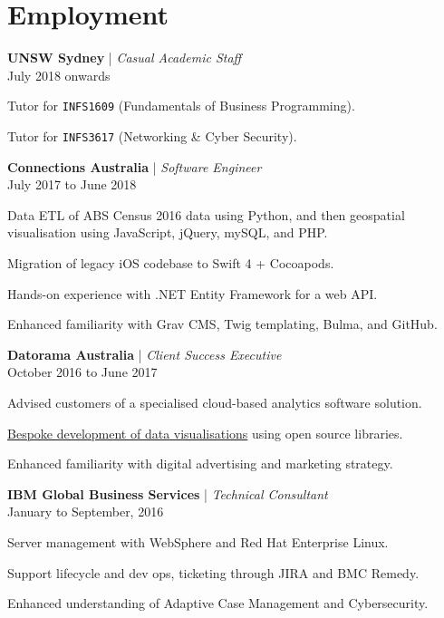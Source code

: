 \section*{Employment}

\noindent \textbf{UNSW Sydney} | \textit{Casual Academic Staff}
\\ July 2018 onwards
\begin{myitemize}
	\item Tutor for \texttt{INFS1609} (Fundamentals of Business Programming).
	\item Tutor for \texttt{INFS3617} (Networking \& Cyber Security).
\end{myitemize}

\vspace{20pt}

\noindent \textbf{Connections Australia} | \textit{Software Engineer}
\\ July 2017 to June 2018
\begin{myitemize}
	\item Data ETL of ABS Census 2016 data using Python, and then geospatial visualisation using JavaScript, jQuery, mySQL, and PHP.
	\item Migration of legacy iOS codebase to Swift 4 + Cocoapods.
	\item Hands-on experience with .NET Entity Framework for a web API.
	\item Enhanced familiarity with Grav CMS, Twig templating, Bulma, and GitHub.
\end{myitemize}

\vspace{20pt}

\noindent \textbf{Datorama Australia} | \textit{Client Success Executive}
\\ October 2016 to June 2017
\begin{myitemize}
	\item Advised customers of a specialised cloud-based analytics software solution.
	\item \href{https://datorama.com/blog/2017/06/28/datorama-tips-tricks-custom-visualizations-d3-js/}{Bespoke development of data visualisations} using open source libraries.
	\item Enhanced familiarity with digital advertising and marketing strategy.
\end{myitemize}

\vspace{20pt}

\noindent \textbf{IBM Global Business Services} | \textit{Technical Consultant}
\\ January to September, 2016
\begin{myitemize}
	\item Server management with WebSphere and Red Hat Enterprise Linux.
	\item Support lifecycle and dev ops, ticketing through JIRA and BMC Remedy.
	\item Enhanced understanding of Adaptive Case Management and Cybersecurity.
\end{myitemize}

